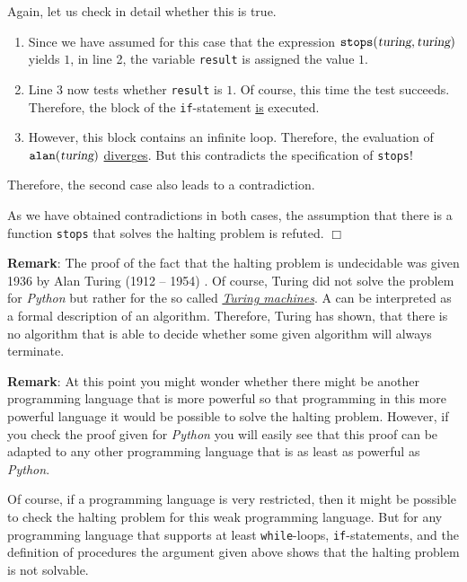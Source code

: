 \begin{enumerate}
      Again, let us check in detail whether this is true.  
      \begin{enumerate}
      \item Since we have assumed for this case that the expression 
            $\mathtt{stops}(\textsl{turing}, \textsl{turing})$ yields $1$, 
            in line 2, the variable \texttt{result} is assigned the value $1$. 
      \item Line 3 now tests whether \texttt{result} is $1$.  Of course,
            this time the test succeeds.  
            Therefore, the block of the \texttt{if}-statement \underline{is} executed.
      \item However, this block contains an infinite loop.  Therefore, the
            evaluation of $\mathtt{alan}(\textsl{turing})$ \underline{diver}g\underline{es}.
            But this contradicts the specification of \texttt{stops}!
      \end{enumerate}   
      Therefore, the second case also leads to a contradiction.
\end{enumerate}
As we have obtained contradictions in both cases, the assumption that there is a function
\texttt{stops} that solves the halting problem is refuted.
\hspace*{\fill} $\Box$
\vspace*{0.3cm}

\noindent
\textbf{Remark}:
The proof of the fact that the halting problem is undecidable was given 1936 by Alan Turing (1912 -- 1954)
\cite{turing:36}.  Of course, Turing did not solve the problem for \textsl{Python} but rather
for the so called 
\href{http://en.wikipedia.org/wiki/Indirect_proof}{\emph{Turing machines}}.  
A  can be interpreted as a formal description of an algorithm.  
Therefore, Turing has shown, that there is no algorithm that is able to decide whether some given
algorithm will always terminate.
\vspace*{0.3cm}

\noindent
\textbf{Remark}:
At this point you might wonder whether there might be another programming language
that is more powerful so that programming in this more powerful language it would be possible to
solve the halting problem.  However, if you check the proof given for \textsl{Python} you will easily
see that this proof can be adapted to any other programming language that is as least as powerful as
\textsl{Python}. 

Of course, if a programming language is very restricted, then it might be possible to check the
halting problem for this weak programming language.  But for any programming language that supports
at least \texttt{while}-loops, \texttt{if}-statements, and the definition of procedures the argument
given above shows that the halting problem is not solvable.

